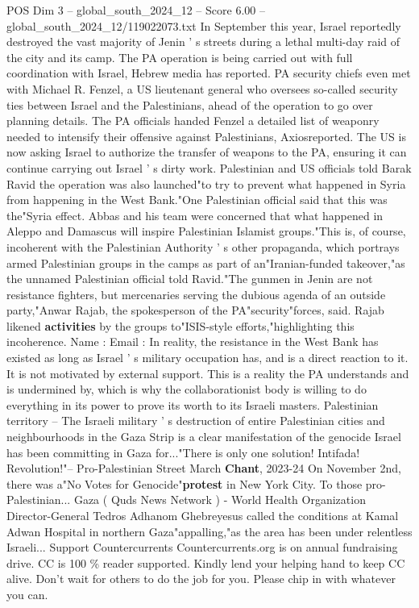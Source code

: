 \begin{textsample}{POS Dim 3 – global\_south\_2024\_12 – Score 6.00 – global\_south\_2024\_12/119022073.txt}
In September this year, Israel reportedly destroyed the vast majority of Jenin ' s streets during a lethal multi-day raid of the city and its camp.
The PA operation is being carried out with full coordination with Israel, Hebrew media has reported.
PA security chiefs even met with Michael R.
Fenzel, a US lieutenant general who oversees so-called security ties between Israel and the Palestinians, ahead of the operation to go over planning details.
The PA officials handed Fenzel a detailed list of weaponry needed to intensify their offensive against Palestinians, Axiosreported.
The US is now asking Israel to authorize the transfer of weapons to the PA, ensuring it can continue carrying out Israel ' s dirty work.
Palestinian and US officials told Barak Ravid the operation was also launched"to try to prevent what happened in Syria from happening in the West Bank."One Palestinian official said that this was the"Syria effect.
Abbas and his team were concerned that what happened in Aleppo and Damascus will inspire Palestinian Islamist groups."This is, of course, incoherent with the Palestinian Authority ' s other propaganda, which portrays armed Palestinian groups in the camps as part of an"Iranian-funded takeover,"as the unnamed Palestinian official told Ravid."The gunmen in Jenin are not resistance fighters, but mercenaries serving the dubious agenda of an outside party,"Anwar Rajab, the spokesperson of the PA"security"forces, said.
Rajab likened \textbf{activities} by the groups to"ISIS-style efforts,"highlighting this incoherence.
Name : Email : In reality, the resistance in the West Bank has existed as long as Israel ' s military occupation has, and is a direct reaction to it.
It is not motivated by external support.
This is a reality the PA understands and is undermined by, which is why the collaborationist body is willing to do everything in its power to prove its worth to its Israeli masters.
Palestinian territory -- The Israeli military ' s destruction of entire Palestinian cities and neighbourhoods in the Gaza Strip is a clear manifestation of the genocide Israel has been committing in Gaza for..."There is only one solution!
Intifada!
Revolution!"-- Pro-Palestinian Street March \textbf{Chant}, 2023-24 On November 2nd, there was a"No Votes for Genocide"\textbf{protest} in New York City.
To those pro-Palestinian...
Gaza ( Quds News Network ) - World Health Organization Director-General Tedros Adhanom Ghebreyesus called the conditions at Kamal Adwan Hospital in northern Gaza"appalling,"as the area has been under relentless Israeli...
Support Countercurrents Countercurrents.org is on annual fundraising drive.
CC is 100 \% reader supported.
Kindly lend your helping hand to keep CC alive.
Don't wait for others to do the job for you.
Please chip in with whatever you can.

\end{textsample}
